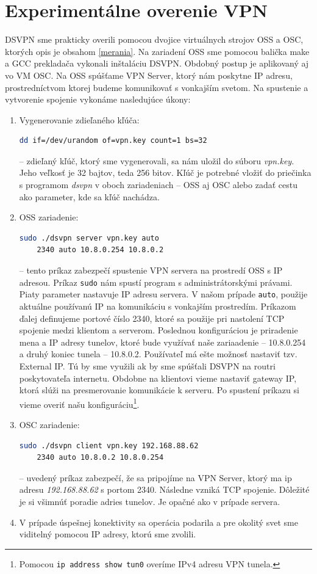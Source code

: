 \section{Experimentálne overenie VPN}
DSVPN sme prakticky overili pomocou dvojice virtuálnych strojov OSS a OSC, ktorých opis je obsahom \ref{merania}. Na zariadení OSS sme pomocou balička make a GCC prekladača vykonali inštaláciu DSVPN. Obdobný postup je aplikovaný aj vo VM OSC. Na OSS spúšťame VPN Server, ktorý nám poskytne IP adresu, prostredníctvom ktorej budeme komunikovať s vonkajším svetom. Na spustenie a vytvorenie spojenie vykonáme nasledujúce úkony:
\begin{enumerate}
	\item Vygenerovanie zdieľaného kľúča:\begin{lstlisting}[language=bash]
		dd if=/dev/urandom of=vpn.key count=1 bs=32
	\end{lstlisting} 
-- zdieľaný kľúč, ktorý sme vygenerovali, sa nám uložil do súboru \textit{vpn.key}. Jeho veľkosť je 32 bajtov, teda 256 bitov. Kľúč je potrebné vložiť do priečinka s programom \textit{dsvpn} v oboch zariadeniach -- OSS aj OSC alebo zadať cestu ako parameter, kde sa kľúč nachádza.
	\item OSS zariadenie: \begin{lstlisting}[language=bash] 
	sudo ./dsvpn server vpn.key auto 
	2340 auto 10.8.0.254 10.8.0.2
	\end{lstlisting} 
-- tento príkaz zabezpečí spustenie VPN servera na prostredí OSS s IP adresou. Príkaz \lstinline|sudo| nám spustí program s administrátorskými právami. Piaty parameter nastavuje IP adresu servera. V našom prípade \lstinline|auto|, použije aktuálne používanú IP na komunikáciu s vonkajším prostredím. Príkazom ďalej definujeme portové číslo 2340, ktoré sa použije pri nastolení TCP spojenie medzi klientom a serverom. Poslednou konfiguráciou je priradenie mena a IP adresy tunelov, ktoré bude využívať naše zariaadenie -- 10.8.0.254 a druhý koniec tunela -- 10.8.0.2. Používateľ má ešte možnosť nastaviť tzv. External IP. Tú by sme využili ak by sme spúšťali DSVPN na routri poskytovateľa internetu. Obdobne na klientovi vieme nastaviť gateway IP, ktorá slúži na presmerovanie komunikácie k serveru. Po spustení príkazu si vieme overiť našu konfiguráciu\footnote{Pomocou \lstinline|ip address show tun0| overíme IPv4 adresu VPN tunela.}. 
	\item OSC zariadenie: \begin{lstlisting}[language=bash] 
	sudo ./dsvpn client vpn.key 192.168.88.62 
	2340 auto 10.8.0.2 10.8.0.254
	\end{lstlisting} 
-- uvedený príkaz zabezpečí, že sa pripojíme na VPN Server, ktorý ma ip adresu \textit{192.168.88.62} s portom 2340. Následne vzniká TCP spojenie. Dôležité je si všimnúť poradie adries tunelov. Je opačné ako v prípade servera. 
	\item V prípade úspešnej konektivity sa operácia podarila a pre okolitý svet sme viditelný pomocou IP adresy, ktorú sme zvolili. 
\end{enumerate}


